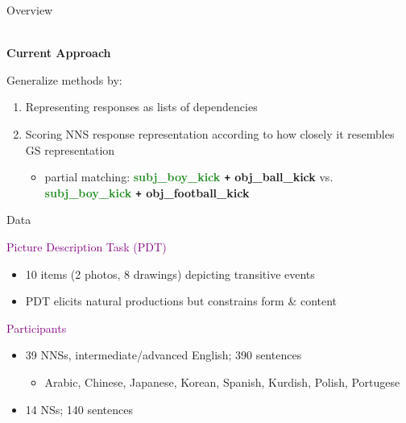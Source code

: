 \documentclass[final,t]{beamer}
\begin{document}
\begin{frame}{}
\begin{columns}[t]
\begin{column}{.33\linewidth}
\begin{block}{Overview}
  \begin{center}
    \mbox{}\\\textbf{Current Approach} 
  \end{center}
    Generalize methods by:\\[0.5em]
    \begin{minipage}{.9\textwidth}
    \begin{enumerate}
    \item Representing responses as lists of dependencies
    \item Scoring NNS response representation according to how closely it resembles GS representation
  	\begin{itemize}
		\item{partial matching: \textbf{\textcolor{forestgreen}{subj\_boy\_kick} \texttt{+} \textcolor{carnelian}{obj\_ball\_kick}} vs. \textbf{\textcolor{forestgreen}{subj\_boy\_kick} \texttt{+} \textcolor{carnelian}{obj\_football\_kick}}}

	\end{itemize}
    \end{enumerate}
  \end{minipage}
\end{block}

\begin{block}{Data}
\begin{center}
  \textcolor{purple}{Picture Description Task (PDT)}
\end{center}
	\vspace{-.38em}
    \begin{itemize}
    \item{10 items (2 photos, 8 drawings) depicting transitive events}
    \item{PDT elicits natural productions but constrains form \& content}
    \end{itemize}
\begin{center}
  \textcolor{purple}{Participants}
\end{center}
	\vspace{-.38em}
    \begin{itemize}
    \item{39 NNSs, intermediate/advanced English; 390 sentences}
      \begin{itemize}
      \item{Arabic, Chinese, Japanese, Korean, Spanish, Kurdish, Polish, Portugese}
      \end{itemize}
      \smallskip
    \item{14 NSs; 140 sentences}
    \end{itemize}
	\bigskip
\setlength{\fboxsep}{3pt}
\setlength{\fboxrule}{0pt}
	

\end{block}
\end{column}
\end{columns}
\end{frame}
\end{document}
